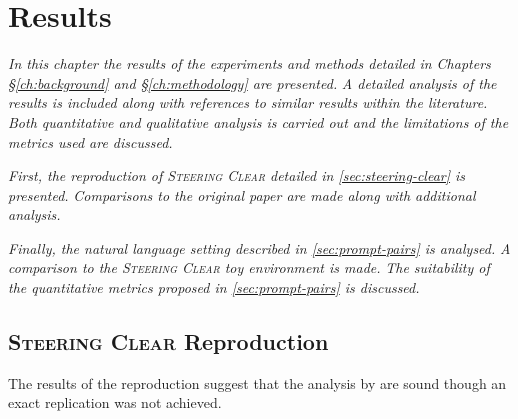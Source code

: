 \chapter{Results}
\label{ch:results}

\emph{In this chapter the results of the experiments and methods detailed in Chapters \S\ref{ch:background} and \S\ref{ch:methodology} are presented.}
\emph{A detailed analysis of the results is included along with references to similar results within the literature.}
\emph{Both quantitative and qualitative analysis is carried out and the limitations of the metrics used are discussed.}

\emph{First, the reproduction of {\scshape Steering Clear} \citep{steering-clear} detailed in \cref{sec:steering-clear} is presented.}
\emph{Comparisons to the original paper are made along with additional analysis.}

\emph{Finally, the natural language setting described in \cref{sec:prompt-pairs} is analysed.}
\emph{A comparison to the {\scshape Steering Clear} toy environment is made.}
\emph{The suitability of the quantitative metrics proposed in \cref{sec:prompt-pairs} is discussed.}

\section{{\scshape Steering Clear} Reproduction}
\label{sec:steering-clear-res}

The results of the reproduction suggest that the analysis by \citet{steering-clear} are sound though an exact replication was not achieved.

